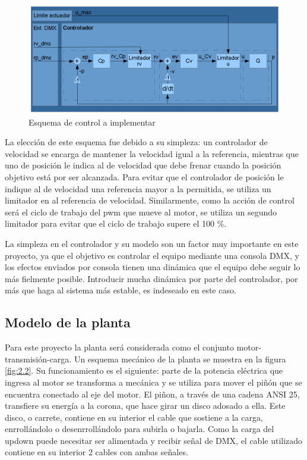 \begin{figure}[!ht]
	\centering
	\includegraphics[width=16cm,scale=1]{resources/2_1-diagramaControlador.png}
	\caption{Esquema de control a implementar}
	\label{fig:\thefigure}
\end{figure}

La elección de este esquema fue debido a su simpleza: un controlador de velocidad se encarga de mantener la velocidad igual a la referencia, mientras que uno de posición le indica al de velocidad que debe frenar cuando la posición objetivo está por ser alcanzada. Para evitar que el controlador de posición le indique al de velocidad una referencia mayor a la permitida, se utiliza un limitador en al referencia de velocidad. Similarmente, como la acción de control será el ciclo de trabajo del pwm que mueve al motor, se utiliza un segundo limitador para evitar que el ciclo de trabajo supere el 100 \%.

La simpleza en el controlador y su modelo son un factor muy importante en este proyecto, ya que el objetivo es controlar el equipo mediante una consola DMX, y los efectos enviados por consola tienen una dinámica que el equipo debe seguir lo más fielmente posible. Introducir mucha dinámica por parte del controlador, por más que haga al sistema más estable, es indeseado en este caso. 

\subsection{Modelo de la planta}
Para este proyecto la planta será considerada como el conjunto motor-transmisión-carga. Un esquema mecánico de la planta se muestra en la figura \ref{fig:2.2}. Su funcionamiento es el siguiente: parte de la potencia eléctrica que ingresa al motor se transforma a mecánica y se utiliza para mover el piñón que se encuentra conectado al eje del motor. El piñon, a través de una cadena ANSI 25, transfiere su energía a la corona, que hace girar un disco adosado a ella. Este disco, o carrete, contiene en su interior el cable que sostiene a la carga, enrrollándolo o desenrrollándolo para subirla o bajarla. Como la carga del updown puede necesitar ser alimentada y recibir señal de DMX, el cable utilizado contiene en su interior 2 cables con ambas señales.

